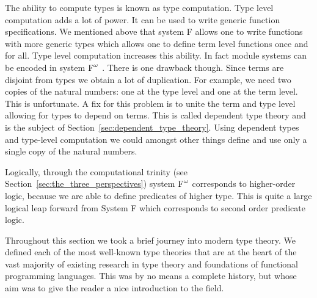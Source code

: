 The ability to compute types is known as type computation.  Type level
computation adds a lot of power.  It can be used to write generic
function specifications.  We mentioned above that system F allows one
to write functions with more generic types which allows one to define
term level functions once and for all.  Type level computation
increases this ability.  In fact module systems can be encoded in
system $\text{F}^\omega$ \cite{Shan:2006}.  There is one drawback though.  Since
terms are disjoint from types we obtain a lot of duplication.  For
example, we need two copies of the natural numbers: one at the type
level and one at the term level.  This is unfortunate.  A fix for this
problem is to unite the term and type level allowing for types to
depend on terms.  This is called dependent type theory and is the
subject of Section~\ref{sec:dependent_type_theory}.  Using dependent
types and type-level computation we could amongst other things define
and use only a single copy of the natural numbers.

Logically, through the computational trinity (see
Section~\ref{sec:the_three_perspectives}) system $\text{F}^\omega$ corresponds to
higher-order logic, because we are able to define predicates of higher
type.  This is quite a large logical leap forward from System F which
corresponds to second order predicate logic.

Throughout this section we took a brief journey into modern type
theory.  We defined each of the most well-known type theories that
are at the heart of the vast majority of existing research in type
theory and foundations of functional programming languages.  This was
by no means a complete history, but whose aim was to give the reader a
nice introduction to the field.
